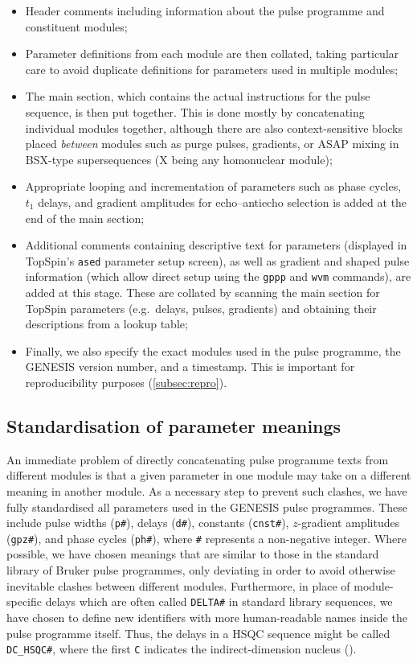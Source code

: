 \documentclass[a4paper,11pt]{article}
\newcommand{\carbon}{\ch{^{13}C}}
\begin{document}
\begin{refsection}
\begin{itemize}
    \item Header comments including information about the pulse programme and constituent modules;
    \item Parameter definitions from each module are then collated, taking particular care to avoid duplicate definitions for parameters used in multiple modules;
    \item The main section, which contains the actual instructions for the pulse sequence, is then put together.
        This is done mostly by concatenating individual modules together, although there are also context-sensitive blocks placed \textit{between} modules such as purge pulses, gradients, or ASAP mixing\autocite{Claridge2019MRC} in BSX-type supersequences (X being any homonuclear module);
    \item Appropriate looping and incrementation of parameters such as phase cycles, \(t_1\) delays, and gradient amplitudes for echo--antiecho selection is added at the end of the main section;
    \item Additional comments containing descriptive text for parameters (displayed in TopSpin's \texttt{ased} parameter setup screen), as well as gradient and shaped pulse information (which allow direct setup using the \texttt{gppp} and \texttt{wvm} commands), are added at this stage.
        These are collated by scanning the main section for TopSpin parameters (e.g.\ delays, pulses, gradients) and obtaining their descriptions from a lookup table;
    \item Finally, we also specify the exact modules used in the pulse programme, the GENESIS version number, and a timestamp. This is important for reproducibility purposes (\cref{subsec:repro}).
\end{itemize}


\subsection{Standardisation of parameter meanings}

An immediate problem of directly concatenating pulse programme texts from different modules is that a given parameter in one module may take on a different meaning in another module.
As a necessary step to prevent such clashes, we have fully standardised all parameters used in the GENESIS pulse programmes.
These include pulse widths (\texttt{p\#}), delays (\texttt{d\#}), constants (\texttt{cnst\#}), \(z\)-gradient amplitudes (\texttt{gpz\#}), and phase cycles (\texttt{ph\#}), where \texttt{\#} represents a non-negative integer.
Where possible, we have chosen meanings that are similar to those in the standard library of Bruker pulse programmes, only deviating in order to avoid otherwise inevitable clashes between different modules.
Furthermore, in place of module-specific delays which are often called \texttt{DELTA\#} in standard library sequences, we have chosen to define new identifiers with more human-readable names inside the pulse programme itself.
Thus, the delays in a HSQC sequence might be called \texttt{DC\_HSQC\#}, where the first \texttt{C} indicates the indirect-dimension nucleus (\carbon{}).


\end{refsection}
\end{document}
